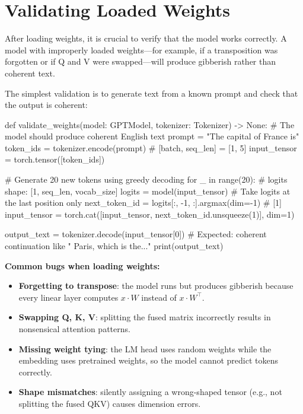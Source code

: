 \section{Validating Loaded Weights}

After loading weights, it is crucial to verify that the model works
correctly. A model with improperly loaded weights---for example, if a
transposition was forgotten or if Q and V were swapped---will produce
gibberish rather than coherent text.

The simplest validation is to generate text from a known prompt and check
that the output is coherent:

\begin{pseudocode}
def validate_weights(model: GPTModel, tokenizer: Tokenizer) -> None:
    # The model should produce coherent English text
    prompt = "The capital of France is"
    token_ids = tokenizer.encode(prompt)
    # [batch, seq_len] = [1, 5]
    input_tensor = torch.tensor([token_ids])

    # Generate 20 new tokens using greedy decoding
    for _ in range(20):
        # logits shape: [1, seq_len, vocab_size]
        logits = model(input_tensor)
        # Take logits at the last position only
        next_token_id = logits[:, -1, :].argmax(dim=-1)  # [1]
        input_tensor = torch.cat([input_tensor, next_token_id.unsqueeze(1)], dim=1)

    output_text = tokenizer.decode(input_tensor[0])
    # Expected: coherent continuation like " Paris, which is the..."
    print(output_text)
\end{pseudocode}

\begin{keyconcept}
  \textbf{Common bugs when loading weights:}
  \begin{itemize}
    \item \textbf{Forgetting to transpose}: the model runs but produces
          gibberish because every linear layer computes $x \cdot W$ instead
          of $x \cdot W^\top$.
    \item \textbf{Swapping Q, K, V}: splitting the fused matrix incorrectly
          results in nonsensical attention patterns.
    \item \textbf{Missing weight tying}: the LM head uses random weights
          while the embedding uses pretrained weights, so the model cannot
          predict tokens correctly.
    \item \textbf{Shape mismatches}: silently assigning a wrong-shaped tensor
          (e.g., not splitting the fused QKV) causes dimension errors.
  \end{itemize}
\end{keyconcept}

